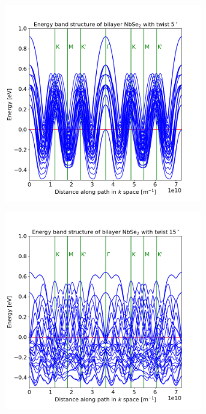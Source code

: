 \documentclass[12pt]{report} %
\begin{document}
\begin{figure}[t!]
\centering
  \begin{subfigure}[t]{0.45\textwidth}
    \centering
    \includegraphics[width=0.95\textwidth]{bilayer_bands_5_coupled.png}
    \caption{
    }
    \label{bilayer_bands_5_coupled}
  \end{subfigure}
  \hfill
  \begin{subfigure}[t]{0.45\textwidth}
    \centering
    \includegraphics[width=0.95\textwidth]{bilayer_bands_15_coupled.png}
    \caption{
    }
    \label{bilayer_bands_15_coupled}
  \end{subfigure}
  \caption{}
  \label{bilayer_bands_coupled}
\end{figure}
\end{document}
